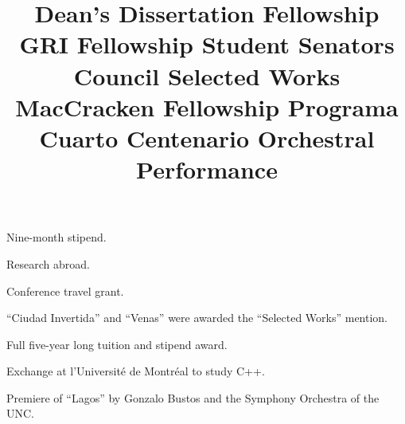  \title{ Dean's Dissertation Fellowship}
 \begin{position}
Nine-month stipend.
\end{position}

 \title{ GRI Fellowship}
 \begin{position}
Research abroad.
\end{position}

 \title{ Student Senators Council}
 \begin{position}
Conference travel grant.
\end{position}

 \title{ Selected Works}
 \begin{position}
``Ciudad Invertida'' and ``Venas'' were awarded the ``Selected Works'' mention.
\end{position}

 \title{ MacCracken Fellowship}
 \begin{position}
Full five-year long tuition and stipend award.
\end{position}

 \title{ Programa Cuarto Centenario}
 \begin{position}
Exchange at l'Université de Montréal to study C++.
\end{position}

 \title{ Orchestral Performance}
 \begin{position}
Premiere of ``Lagos'' by Gonzalo Bustos and the Symphony Orchestra of the UNC.
\end{position}